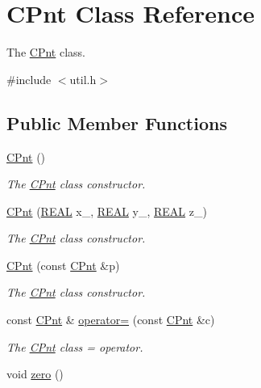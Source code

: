 \hypertarget{classCPnt}{\section{C\-Pnt Class Reference}
\label{classCPnt}
}


The \hyperlink{classCPnt}{C\-Pnt} class.  




{\ttfamily \#include $<$util.\-h$>$}

\subsection*{Public Member Functions}
\begin{DoxyCompactItemize}
\item 
\hyperlink{classCPnt_a6792dcfc8b95c18c03bda5a6dde7765a}{C\-Pnt} ()
\begin{DoxyCompactList}\small\item\em The \hyperlink{classCPnt}{C\-Pnt} class constructor. \end{DoxyCompactList}\item 
\hyperlink{classCPnt_a91907d073421cdf75000d27f982f058b}{C\-Pnt} (\hyperlink{util_8h_a5821460e95a0800cf9f24c38915cbbde}{R\-E\-A\-L} x\-\_\-, \hyperlink{util_8h_a5821460e95a0800cf9f24c38915cbbde}{R\-E\-A\-L} y\-\_\-, \hyperlink{util_8h_a5821460e95a0800cf9f24c38915cbbde}{R\-E\-A\-L} z\-\_\-)
\begin{DoxyCompactList}\small\item\em The \hyperlink{classCPnt}{C\-Pnt} class constructor. \end{DoxyCompactList}\item 
\hyperlink{classCPnt_aca4d8d7044e71700128b497cfcc4f1d8}{C\-Pnt} (const \hyperlink{classCPnt}{C\-Pnt} \&p)
\begin{DoxyCompactList}\small\item\em The \hyperlink{classCPnt}{C\-Pnt} class constructor. \end{DoxyCompactList}\item 
const \hyperlink{classCPnt}{C\-Pnt} \& \hyperlink{classCPnt_abd18aa7c83ac70f5e73847a8cd154e9d}{operator=} (const \hyperlink{classCPnt}{C\-Pnt} \&c)
\begin{DoxyCompactList}\small\item\em The \hyperlink{classCPnt}{C\-Pnt} class = operator. \end{DoxyCompactList}\item 
void \hyperlink{classCPnt_a619a71665a5a40fddbc8e6c6a6b450cc}{zero} ()

\end{DoxyCompactItemize}
